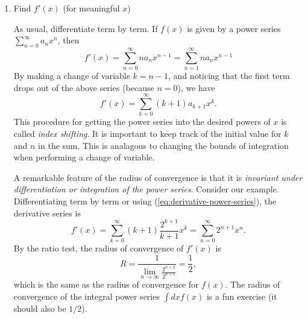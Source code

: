 \documentclass[11pt, letterpaper, oneside]{article}     %
\numberwithin{equation}{subsection}
\theoremstyle{definition}
\numberwithin{theorem}{section}
\theoremstyle{remark}
\begin{document}
\begin{enumerate}
\begin{enumerate}
    \bigskip

  \item Find $f'(x)$ (for meaningful $x$)

    As usual, differentiate term by term. If $f(x)$ is given by a power series $\sum_{n=0}^\infty a_nx^n$, then
    \begin{equation}\label{eq:power-series-function-derivative}
      f'(x) = \sum_{n=0}^\infty na_nx^{n-1} = \sum_{n=1}^\infty na_nx^{n-1}
    \end{equation}
    By making a change of variable $k = n-1$, and noticing that the first term drops out of the above series (because $n=0$), we have
    \begin{equation}\label{eq:derivative-power-series}
      f'(x) = \sum_{k=0}^\infty (k+1)a_{k+1}x^k.
    \end{equation}
    This procedure for getting the power series into the desired powers of $x$ is called \emph{index shifting}. It is important to keep track of the initial value for $k$ and $n$ in the sum. This is analagous to changing the bounds of integration when performing a change of variable.

    A remarkable feature of the radius of convergence is that it is \emph{invariant under differentiation or integration of the power series}. Consider our example. Differentiating term by term or using (\ref{eq:derivative-power-series}), the derivative series is
    \begin{equation}
      f'(x) = \sum_{k=0}^\infty (k+1)\frac{2^{k+1}}{k+1}x^k
      = \sum_{n=0}^\infty 2^{n+1}x^n.
    \end{equation}
    By the ratio test, the radius of convergence of $f'(x)$ is
    \begin{equation}
      R = \frac{1}{\lim_{n\to\infty}\frac{2^{n+2}}{2^{n+1}}}
      = \frac{1}{2},
    \end{equation}
    which is the same as the radius of convergence for $f(x)$. The radius of convergence of the integral power series $\int dx f(x)$ is a fun exercise (it should also be $1/2$).


\end{enumerate}
\end{enumerate}
\end{document}

